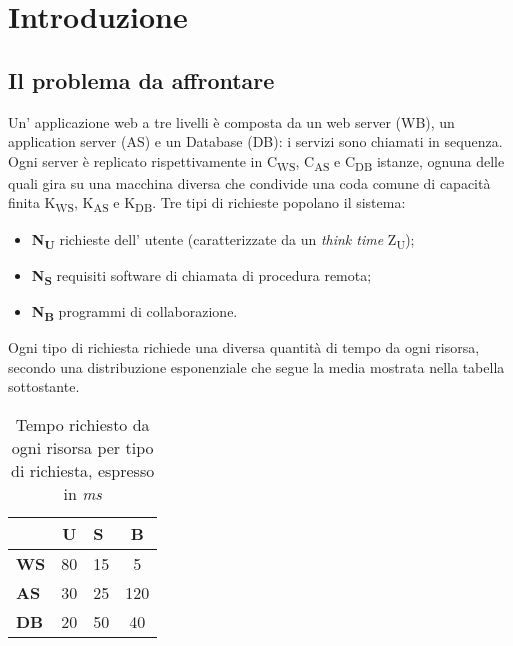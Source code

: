 \documentclass[../main.tex]{subfiles}
\begin{document}
    \chapter{Introduzione}\label{ch:introduzione}
    \section{Il problema da affrontare}\label{sec:Il-problema-da-affrontare}
    Un' applicazione web a tre livelli è composta da un web server (WB), un application server (AS) e un Database (DB): i servizi sono chiamati in sequenza.
    Ogni server è replicato rispettivamente in C\textsubscript{WS}, C\textsubscript{AS} e C\textsubscript{DB} istanze, ognuna delle quali gira su una macchina diversa che condivide una coda comune di capacità finita K\textsubscript{WS}, K\textsubscript{AS} e K\textsubscript{DB}.
    \newline Tre tipi di richieste popolano il sistema:
    \begin{itemize}
        \item \textbf{N\textsubscript{U}} richieste dell' utente (caratterizzate da un \textit{think time} Z\textsubscript{U});
        \item \textbf{N\textsubscript{S}} requisiti software di chiamata di procedura remota;
        \item \textbf{N\textsubscript{B}} programmi di collaborazione.
    \end{itemize}
    Ogni tipo di richiesta richiede una diversa quantità di tempo da ogni risorsa, secondo una distribuzione esponenziale che segue la media mostrata nella tabella sottostante.
    \begin{table}[h]
        \centering
        \begin{tabular}{|l|c|l|c|}
            \hline
            & \textbf{U} & \textbf{S} & \textbf{B} \\ [0.5ex]
            \hline
            \textbf{WS} & 80         & 15         & 5          \\
            \textbf{AS} & 30         & 25         & 120        \\
            \textbf{DB} & 20         & 50         & 40         \\
            \hline
        \end{tabular}
        \caption{Tempo richiesto da ogni risorsa per tipo di richiesta, espresso in \textit{ms}}
        \label{tab:tempo-richiesto-da-ogni-risorsa-per-tipo-di-richiesta}
    \end{table}
\end{document}

